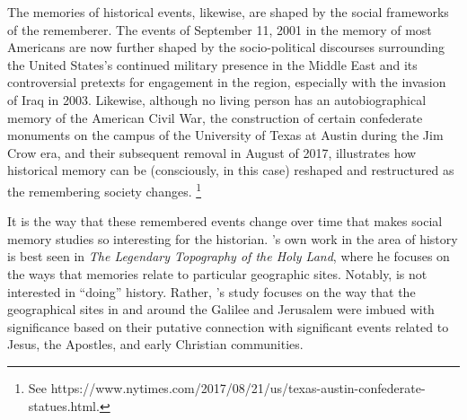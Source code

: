 The memories of historical events, likewise, are shaped by the social frameworks of the rememberer. The events of September 11, 2001 in the memory of most Americans are now further shaped by the socio-political discourses surrounding the United States's continued military presence in the Middle East and its controversial pretexts for engagement in the region, especially with the invasion of Iraq in 2003. Likewise, although no living person has an autobiographical memory of the American Civil War, the construction of certain confederate monuments on the campus of the University of Texas at Austin during the Jim Crow era, and their subsequent removal in August of 2017, illustrates how historical memory can be (consciously, in this case) reshaped and restructured as the remembering society changes.%
    \footnote{%
        See https://www.nytimes.com/2017/08/21/us/texas-austin-confederate-statues.html.}  

It is the way that these remembered events change over time that makes social memory studies so interesting for the historian. \halbwachs's own work in the area of history is best seen in \emph{The Legendary Topography of the Holy Land}, where he focuses on the ways that memories relate to particular geographic sites. Notably, \halbwachs is not interested in ``doing'' history. Rather, \halbwachs's study focuses on the way that the geographical sites in and around the Galilee and Jerusalem were imbued with significance based on their putative connection with significant events related to Jesus, the Apostles, and early Christian communities. 


